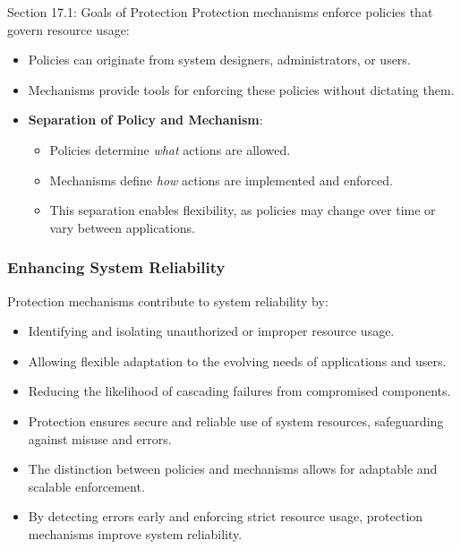 \begin{notes}{Section 17.1: Goals of Protection}
    Protection mechanisms enforce policies that govern resource usage:
    \begin{itemize}
        \item Policies can originate from system designers, administrators, or users.
        \item Mechanisms provide tools for enforcing these policies without dictating them.
        \item \textbf{Separation of Policy and Mechanism}:
        \begin{itemize}
            \item Policies determine \textit{what} actions are allowed.
            \item Mechanisms define \textit{how} actions are implemented and enforced.
            \item This separation enables flexibility, as policies may change over time or vary between applications.
        \end{itemize}
    \end{itemize}
    
    \subsubsection*{Enhancing System Reliability}
    
    Protection mechanisms contribute to system reliability by:
    \begin{itemize}
        \item Identifying and isolating unauthorized or improper resource usage.
        \item Allowing flexible adaptation to the evolving needs of applications and users.
        \item Reducing the likelihood of cascading failures from compromised components.
    \end{itemize}
    
    \begin{highlight}
        \begin{itemize}
            \item Protection ensures secure and reliable use of system resources, safeguarding against misuse and errors.
            \item The distinction between policies and mechanisms allows for adaptable and scalable enforcement.
            \item By detecting errors early and enforcing strict resource usage, protection mechanisms improve system reliability.
        \end{itemize}
    \end{highlight}
\end{notes}


